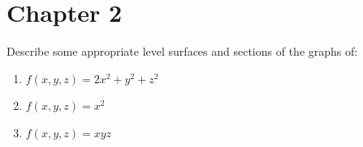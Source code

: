 \documentclass[openany]{book}
\begin{document}
\section{Chapter 2}

\begin{prob}[2]
    Describe some appropriate level surfaces and sections of the graphs of:

    \begin{enumerate}
        \item[(a)] \( f(x, y, z) = 2x^2 + y^2 + z^2 \)
        \item[(b)] \( f(x, y, z) = x^2 \)
        \item[(c)] \( f(x, y, z) = xyz \)
    \end{enumerate}
\end{prob}
\end{document}
